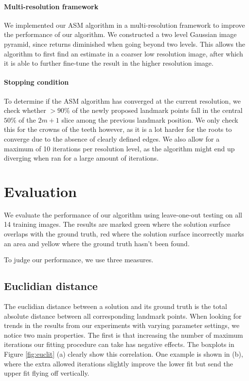 \documentclass[a4paper,titlepage,12pt]{article}
\begin{document}
\paragraph{Multi-resolution framework}
We implemented our ASM algorithm in a multi-resolution framework to improve the performance of our algorithm.
We constructed a two level Gaussian image pyramid, since returns diminished when going beyond two levels.
This allows the algorithm to first find an estimate in a coarser low resolution image, after which it is able to further fine-tune the result in the higher resolution image.

\paragraph{Stopping condition}

To determine if the ASM algorithm has converged at the current resolution, we check whether $>90\%$ of the newly proposed landmark points fall in the central $50\%$ of the $2m + 1$ slice among the previous landmark position.
We only check this for the crowns of the teeth however, as it is a lot harder for the roots to converge due to the absence of clearly defined edges.
We also allow for a maximum of 10 iterations per resolution level, as the algorithm might end up diverging when ran for a large amount of iterations.

\section{Evaluation}
\label{sec:eval}
We evaluate the performance of our algorithm using leave-one-out testing on all 14 training images. The results are marked {\color{green} green} where the solution surface overlaps with the ground truth, {\color{red} red} where the solution surface incorrectly marks an area and {\color{yellow} yellow} where the ground truth hasn't been found. 

To judge our performance, we use three measures. 

\subsection{Euclidian distance}
The euclidian distance between a solution and its ground truth is the total absolute distance between all corresponding landmark points. When looking for trends in the results from our experiments with varying parameter settings, we notice two main properties. The first is that increasing the number of maximum iterations our fitting procedure can take has negative effects. The boxplots in Figure \ref{fig:euclit} (a) clearly show this correlation. One example is shown in (b), where the extra allowed iterations slightly improve the lower fit but send the upper fit flying off vertically. 
\end{document}
